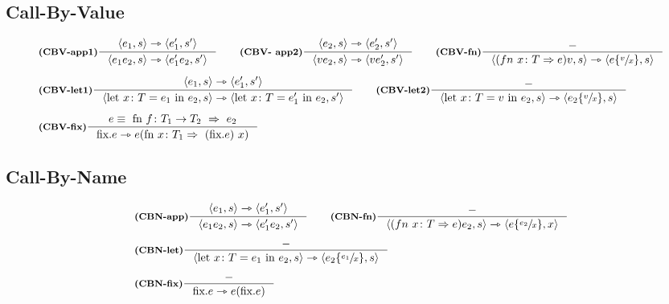 \documentclass[a4paper, 10pt]{article}
\newcommand{\infer}[4]{\inference[\textbf{#1}]{#2}{#3}#4 }
\newcommand{\srule}[2]{\langle #1 \rangle \rightarrowtriangle \langle #2 \rangle}
\newcommand{\srulea}[2]{ #1  \rightarrowtriangle #2}
\newcommand{\letin}[2]{\text{let } #1 \text{ in } #2}
\newcommand{\subs}[3]{#1 \lbrace \sfrac{#2}{#3} \rbrace}
\begin{document}
\begin{minipage}{.45\linewidth}
\begin{flushleft}
\subsection*{Call-By-Value}
	\begin{align*}
		&\infer{(CBV-app1)}{\srule{e_1, s}{e_1', s'}}{\srule{e_1 e_2, s}{e_1'e_2, s'}}{} \qquad
		\infer{(CBV- app2)}{\srule{e_2, s}{e_2', s'}}{\srule{ve_2, s}{ve_2', s'}}{} \qquad
		\infer{(CBV-fn)}{-}{\srule{(fn\ x\colon T\Rightarrow e)v, s}{\subs{e}{v}{x}, s}}{} \\ \\
		&\infer{(CBV-let1)}{\srule{e_1,s}{e_1', s'}}{\srule{\letin{x\colon T = e_1}{e_2, s}}{\letin{x\colon T = e_1'}{e_2, s'}}}{} \qquad
		\infer{(CBV-let2)}{-}{\srule{\letin{x\colon T = v}{e_2, s}}{\subs{e_2}{v}{x}, s}}{} \\ \\
		&\infer{(CBV-fix)}{e\equiv\ \text{fn } f\colon T_1 \rightarrow T_2\ \Rightarrow\ e_2}{\srulea{\text{fix}.e}{e(\text{fn }x\colon T_1 \Rightarrow\ (\text{fix}.e)\ x)}}{}
	\end{align*}
\subsection*{Call-By-Name}
	\begin{align*}
		&\infer{(CBN-app)}{\srule{e_1, s}{e_1', s'}}{\srule{e_1e_2, s}{e_1'e_2, s'}}{} \qquad
		\infer{(CBN-fn)}{-}{\srule{(fn\ x\colon T\Rightarrow e)e_2, s}{\subs{e}{e_2}{x},x}}{} \\ \\
		&\infer{(CBN-let)}{-}{\srule{\letin{x\colon T = e_1}{e_2, s}}{\subs{e_2}{e_1}{x}, s}}{} \\ \\
		&\infer{(CBN-fix)}{-}{\srulea{\text{fix}.e}{e(\text{fix}.e)}}{}
	\end{align*}
	\end{flushleft}
\end{minipage}
	\newpage
	
\end{document}
